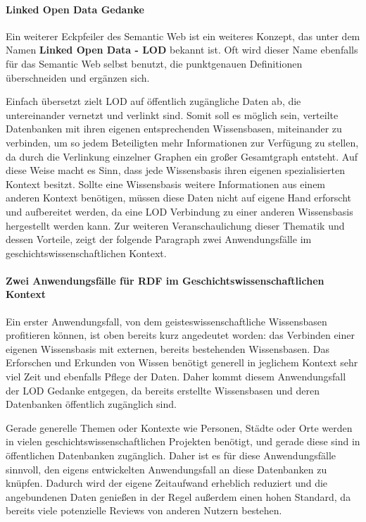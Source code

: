 \paragraph{Linked Open Data Gedanke}

Ein weiterer Eckpfeiler des Semantic Web ist ein weiteres Konzept, das unter dem Namen \textbf{Linked Open Data - LOD} bekannt ist. Oft wird dieser Name ebenfalls für das Semantic Web selbst benutzt, die punktgenauen Definitionen überschneiden und ergänzen sich.

Einfach übersetzt zielt LOD auf öffentlich zugängliche Daten ab, die untereinander vernetzt und verlinkt sind. Somit soll es möglich sein, verteilte Datenbanken mit ihren eigenen entsprechenden Wissensbasen, miteinander zu verbinden, um so jedem Beteiligten mehr Informationen zur Verfügung zu stellen, da durch die Verlinkung einzelner Graphen ein großer Gesamtgraph entsteht. Auf diese Weise macht es Sinn, dass jede Wissensbasis ihren eigenen spezialisierten Kontext besitzt. Sollte eine Wissensbasis weitere Informationen aus einem anderen Kontext benötigen, müssen diese Daten nicht auf eigene Hand erforscht und aufbereitet werden, da eine LOD Verbindung zu einer anderen Wissensbasis hergestellt werden kann. Zur weiteren Veranschaulichung dieser Thematik und dessen Vorteile, zeigt der folgende Paragraph zwei Anwendungsfälle im geschichtswissenschaftlichen Kontext.

\paragraph{Zwei Anwendungsfälle für RDF im Geschichtswissenschaftlichen Kontext}

Ein erster Anwendungsfall, von dem geisteswissenschaftliche Wissensbasen profitieren können, ist oben bereits kurz angedeutet worden: das Verbinden einer eigenen Wissensbasis mit externen, bereits bestehenden Wissensbasen. Das Erforschen und Erkunden von Wissen benötigt generell in jeglichem Kontext sehr viel Zeit und ebenfalls Pflege der Daten. Daher kommt diesem Anwendungsfall der LOD Gedanke entgegen, da bereits erstellte Wissensbasen und deren Datenbanken öffentlich zugänglich sind.

Gerade generelle Themen oder Kontexte wie Personen, Städte oder Orte werden in vielen geschichtswissenschaftlichen Projekten benötigt, und gerade diese sind in öffentlichen Datenbanken zugänglich. Daher ist es für diese Anwendungsfälle sinnvoll, den eigens entwickelten Anwendungsfall an diese Datenbanken zu knüpfen. Dadurch wird der eigene Zeitaufwand erheblich reduziert und die angebundenen Daten genießen in der Regel außerdem einen hohen Standard, da bereits viele potenzielle Reviews von anderen Nutzern bestehen.

